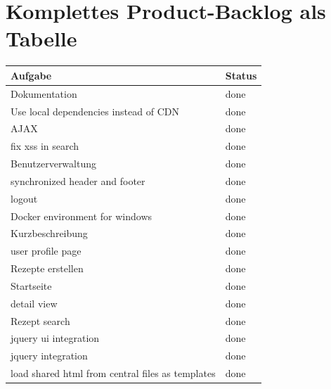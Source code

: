 \documentclass{article}
\begin{document}
\section{Komplettes Product-Backlog als Tabelle}
\begin{table}[hbt!]
\centering
\begin{tabular}{@{}|l|l|@{}}
\hline
Aufgabe                                                                 & Status    \\ \hline
Dokumentation                                                           & done      \\ 
Use local dependencies instead of CDN                                   & done      \\ 
AJAX                                                                    & done      \\ 
fix xss in search                                                       & done      \\ 
Benutzerverwaltung                                                      & done      \\ 
synchronized header and footer                                          & done      \\ 
logout                                                                  & done      \\ 
Docker environment for windows                                          & done      \\ 
Kurzbeschreibung                                                        & done      \\ 
user profile page                                                       & done      \\ 
Rezepte erstellen                                                       & done      \\ 
Startseite                                                              & done      \\ 
detail view                                                             & done      \\ 
Rezept search                                                           & done      \\ 
jquery ui integration                                                   & done      \\ 
jquery integration                                                      & done      \\ 
load shared html from central files as templates                        & done      \\ 

\end{tabular}
\end{table}
\end{document}
